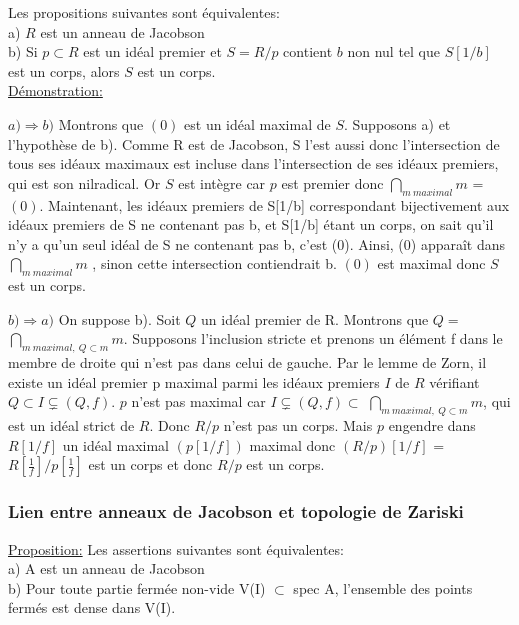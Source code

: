 \documentclass[10pt, twoside]{article}
\theoremstyle{plain}
\theoremstyle{definition}
\theoremstyle{plain}
\theoremstyle{plain}
\theoremstyle{definition}
\theoremstyle{remark}
\begin{document}
Les propositions suivantes sont équivalentes:
\\ a) $R$ est un anneau de Jacobson 
\\ b) Si $p\subset R$ est un idéal premier et $S= R/p$ contient $b$ non nul tel que $S[1/b]$ est un corps, alors $S$ est un corps.
\\
\underline{Démonstration:}
\\
\item[•] $ a) \Rightarrow b) $ Montrons que $(0)$ est un idéal maximal de $S$. Supposons a) et l’hypothèse de b). Comme R est de Jacobson, S l’est aussi donc l’intersection de tous ses idéaux maximaux est incluse dans l’intersection de ses idéaux premiers, qui est son
nilradical. Or $S$ est intègre car $p$ est premier donc $\bigcap_{m  \ maximal }^{} m $ = $(0)$. Maintenant, les idéaux premiers de S[1/b] correspondant bijectivement aux idéaux premiers de S ne contenant pas b, et S[1/b] étant un corps, on sait qu’il n’y a qu’un seul
idéal de S ne contenant pas b, c’est (0). Ainsi, (0) apparaît dans $\bigcap_{m  \ maximal }^{} m $ , sinon cette intersection contiendrait b. $(0)$ est maximal donc $S$ est un corps.
\\
\item[•] $ b) \Rightarrow a) $ On suppose b). Soit $Q$ un idéal premier de R. Montrons que $Q= $$\bigcap_{m  \ maximal, \ Q \subset m }^{} m $. Supposons l'inclusion stricte et prenons un élément f dans le membre de droite qui n'est pas dans celui de gauche. Par le lemme de Zorn, il existe un idéal premier p maximal parmi les idéaux premiers $I$ de $R$ vérifiant  $Q \subset I \subsetneq (Q,f)$. $p$ n'est pas maximal car $ I \subsetneq (Q,f) \subset $ $\bigcap_{m  \ maximal, \ Q \subset m }^{} m $, qui est un idéal strict de $R$. Donc $R/p$ n'est pas un corps. Mais $p$ engendre dans $R[1/f]$ un idéal maximal $(p[1/f])$ maximal donc $(R/p)[1/f]$ = $R[\frac{1}{f}]/p[\frac{1}{f}] $ est un corps et donc $R/p$ est un corps.

\subsubsection{Lien entre anneaux de Jacobson et topologie de Zariski}

\underline{Proposition:}
Les assertions suivantes sont équivalentes:
\\ a) A est un anneau de Jacobson
\\ b) Pour toute partie fermée non-vide V(I) $\subset$ spec A, l’ensemble des points fermés est dense dans V(I).
\end{document}
